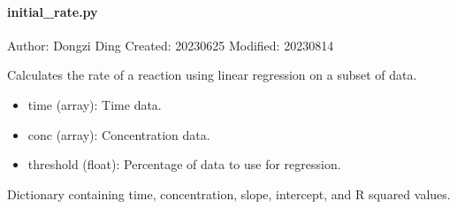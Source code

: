 \documentclass[a4paper,10pt,english]{sphinxmanual}
\begin{document}
\paragraph{initial\_rate.py}
\label{\detokenize{utils:initial-rate-py}}
\sphinxAtStartPar
Author: Dongzi Ding
Created: 2023\sphinxhyphen{}06\sphinxhyphen{}25
Modified: 2023\sphinxhyphen{}08\sphinxhyphen{}14

\begin{fulllineitems}
\label{\detokenize{utils:src.utils.initial_rate.calculate_rate}}
\pysigstartsignatures
{}
\pysigstopsignatures
\sphinxAtStartPar
Calculates the rate of a reaction using linear regression on a subset of data.
\begin{description}
\begin{itemize}
\item {} 
\sphinxAtStartPar
time (array): Time data.

\item {} 
\sphinxAtStartPar
conc (array): Concentration data.

\item {} 
\sphinxAtStartPar
threshold (float): Percentage of data to use for regression.

\end{itemize}

\sphinxAtStartPar
Dictionary containing time, concentration, slope, intercept, and R squared values.

\end{description}

\end{fulllineitems}

\end{document}
